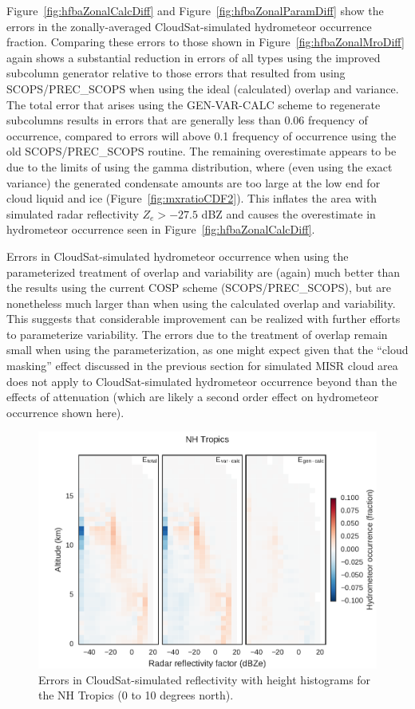 Figure~\ref{fig:hfbaZonalCalcDiff} and
Figure~\ref{fig:hfbaZonalParamDiff} show the errors in the
zonally-averaged CloudSat-simulated hydrometeor occurrence fraction.
Comparing these errors to those shown in
Figure~\ref{fig:hfbaZonalMroDiff} again shows a substantial reduction in
errors of all types using the improved subcolumn generator relative to
those errors that resulted from using SCOPS/PREC\_SCOPS when using the
ideal (calculated) overlap and variance. The total error that arises
using the GEN-VAR-CALC scheme to regenerate subcolumns results in errors
that are generally less than 0.06 frequency of occurrence, compared to
errors will above 0.1 frequency of occurrence using the old
SCOPS/PREC\_SCOPS routine. The remaining overestimate appears to be due
to the limits of using the gamma distribution, where (even using the
exact variance) the generated condensate amounts are too large at the
low end for cloud liquid and ice (Figure~\ref{fig:mxratioCDF2}). This
inflates the area with simulated radar reflectivity \(Z_e > -27.5\) dBZ
and causes the overestimate in hydrometeor occurrence seen in
Figure~\ref{fig:hfbaZonalCalcDiff}.

Errors in CloudSat-simulated hydrometeor occurrence when using the
parameterized treatment of overlap and variability are (again) much
better than the results using the current COSP scheme
(SCOPS/PREC\_SCOPS), but are nonetheless much larger than when using the
calculated overlap and variability. This suggests that considerable
improvement can be realized with further efforts to parameterize
variability. The errors due to the treatment of overlap remain small
when using the parameterization, as one might expect given that the
``cloud masking'' effect discussed in the previous section for simulated
MISR cloud area does not apply to CloudSat-simulated hydrometeor
occurrence beyond than the effects of attenuation (which are likely a
second order effect on hydrometeor occurrence shown here).

\begin{figure}[htbp]
\centering
\includegraphics{graphics/subgrid2_cfadDbze94_NHTropics_gen-var-calc_diff.pdf}
\caption{\label{fig:cfadTropicsCalcDiff}Errors in CloudSat-simulated
reflectivity with height histograms for the NH Tropics (0 to 10 degrees
north).}\label{fig:cfadTropicsCalcDiff}
\end{figure}

